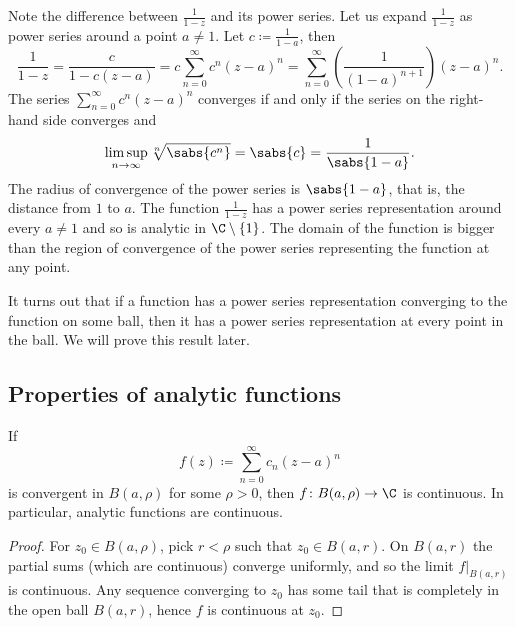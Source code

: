 \begin{example}
Note the difference between $\frac{1}{1-z}$ and its power series.  Let us
expand $\frac{1}{1-z}$ as power series around a point $a \not= 1$.
Let $c \coloneqq \frac{1}{1-a}$, then
\begin{equation*}
\frac{1}{1-z} = 
\frac{c}{1-c(z-a)}
=
c
\sum_{n=0}^\infty c^{n} {(z-a)}^n
=
\sum_{n=0}^\infty \left( \frac{1}{{(1-a)}^{n+1}} \right) {(z-a)}^n .
\end{equation*}
The series $\sum_{n=0}^\infty c^n {(z-a)}^n$ converges if and only if 
the series on the right-hand side converges and
\begin{equation*}
\limsup_{n\to\infty}
\sqrt[n]{\sabs{c^n}} = \sabs{c}
= \frac{1}{\sabs{1-a}} .
\end{equation*}
The radius of convergence of the power series is $\sabs{1-a}$, that is, the
distance from $1$ to $a$.  The function $\frac{1}{1-z}$
has a power series
representation around every $a\not= 1$ and so is analytic in $\C \setminus
\{ 1 \}$.
The domain of the function is bigger than the region
of convergence of the power series representing the function at any point.
\end{example}

It turns out that 
if a function has a power series representation converging to the function
on some ball,
then it has a power series representation at every point in the ball.  We will prove this
result later.

\subsection{Properties of analytic functions}

\begin{prop}
If
\begin{equation*}
f(z) \coloneqq \sum_{n=0}^\infty c_n {(z-a)}^n
\end{equation*}
is convergent in $B(a,\rho)$ for some $\rho > 0$, then
$f \colon B(a,\rho) \to \C$ is continuous.
In particular, analytic functions are continuous.
\end{prop}

\begin{proof}
For $z_0 \in B(a,\rho)$, pick $r < \rho$ such that $z_0 \in B(a,r)$.
On $B(a,r)$ the
partial sums (which are continuous) converge uniformly,
and so the limit $f|_{B(a,r)}$ is continuous.
Any sequence converging to
$z_0$ has some tail that is completely in the open ball $B(a,r)$,
hence $f$ is continuous at $z_0$.
\end{proof}

